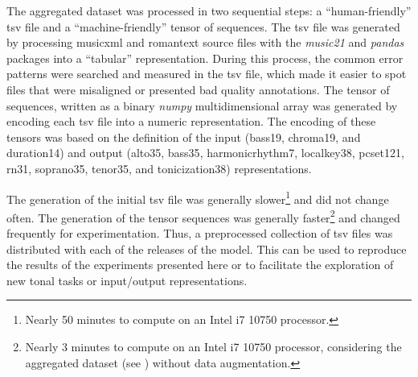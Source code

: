 
The aggregated dataset was processed in two sequential
steps: a ``human-friendly'' \gls{tsv} file and a
``machine-friendly'' tensor of sequences. The \gls{tsv} file
was generated by processing \gls{musicxml} and
\gls{romantext} source files with the \emph{music21}
\parencite{cuthbert2010music21} and \emph{pandas}
\parencite{mckinney2011pandas} packages into a ``tabular''
representation. During this process, the common error
patterns were searched and measured in the \gls{tsv} file,
which made it easier to spot files that were misaligned or
presented bad quality annotations. The tensor of sequences,
written as a binary \emph{numpy}
\parencite{oliphant2006guide} multidimensional array was
generated by encoding each \gls{tsv} file into a numeric
representation. The encoding of these tensors was based on
the definition of the input (\gls{bass19}, \gls{chroma19},
and \gls{duration14}) and output (\gls{alto35},
\gls{bass35}, \gls{harmonicrhythm7}, \gls{localkey38},
\gls{pcset121}, \gls{rn31}, \gls{soprano35}, \gls{tenor35},
and \gls{tonicization38}) representations.

The generation of the initial \gls{tsv} file was generally
slower\footnote{Nearly 50 minutes to compute on an Intel i7
10750 processor.} and did not change often. The generation
of the tensor sequences was generally faster\footnote{Nearly
3 minutes to compute on an Intel i7 10750 processor,
considering the aggregated dataset (see
) without data augmentation.}
and changed frequently for experimentation. Thus, a
preprocessed collection of \gls{tsv} files was distributed
with each of the releases of the model. This can be used to
reproduce the results of the experiments presented here or
to facilitate the exploration of new tonal tasks or
input/output representations.
